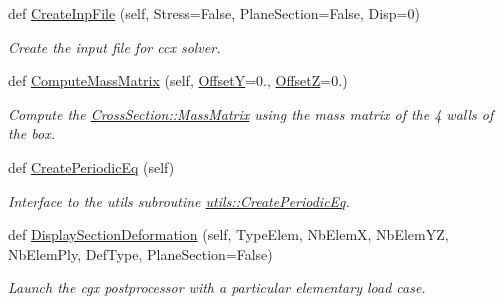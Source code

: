 \begin{DoxyCompactItemize}
def \hyperlink{classgebtaero_1_1_composite_box_1_1_composite_box_a005e7c9de0e4307ad9ff7ed4e8f7c8a4}{Create\+Inp\+File} (self, Stress=False, Plane\+Section=False, Disp=0)
\begin{DoxyCompactList}\small\item\em Create the input file for ccx solver. \end{DoxyCompactList}\item 
def \hyperlink{classgebtaero_1_1_composite_box_1_1_composite_box_a6b944eeef7002377d7b83c5dd6ae6550}{Compute\+Mass\+Matrix} (self, \hyperlink{classgebtaero_1_1_composite_box_1_1_composite_box_a26fcf7763030afb28f45f2354125c352}{OffsetY}=0., \hyperlink{classgebtaero_1_1_composite_box_1_1_composite_box_a50e38078e66133a95f34f2d9176329d9}{OffsetZ}=0.)
\begin{DoxyCompactList}\small\item\em Compute the \hyperlink{classgebtaero_1_1_cross_section_1_1_cross_section_ae9be8649853163b2b4dfdaa3584d9f78}{Cross\+Section\+::\+Mass\+Matrix} using the mass matrix of the 4 walls of the box. \end{DoxyCompactList}\item 
def \hyperlink{classgebtaero_1_1_composite_box_1_1_composite_box_a9328777b54ead0767f0075fe599b09d9}{Create\+Periodic\+Eq} (self)
\begin{DoxyCompactList}\small\item\em Interface to the utils subroutine \hyperlink{namespacegebtaero_1_1utils_a4f786ecbe66af9f64c802adf4e0a990f}{utils\+::\+Create\+Periodic\+Eq}. \end{DoxyCompactList}\item 
def \hyperlink{classgebtaero_1_1_composite_box_1_1_composite_box_a024d2118868a02e7e6218300435148e0}{Display\+Section\+Deformation} (self, Type\+Elem, Nb\+ElemX, Nb\+Elem\+YZ, Nb\+Elem\+Ply, Def\+Type, Plane\+Section=False)
\begin{DoxyCompactList}\small\item\em Launch the cgx postprocessor with a particular elementary load case. \end{DoxyCompactList}\end{DoxyCompactItemize}

